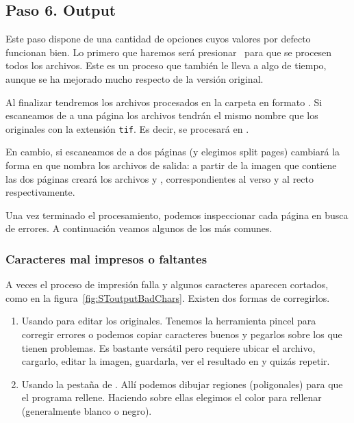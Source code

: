 \documentclass[%
	a5paper,
	10pt,
	twoside,
	openright,
	final,
]{memoir}
\begin{document}
{	\subsection{Paso 6. Output\label{sec:SToutput}} Este paso dispone de una cantidad de opciones cuyos valores por defecto funcionan bien. Lo primero que haremos será presionar \play\ para que se procesen todos los archivos. Este es un proceso que también le lleva a \scantailorAdvanced algo de tiempo, aunque se ha mejorado mucho respecto de la versión original.

	Al finalizar tendremos los archivos procesados en la carpeta  en formato \tiff. Si escaneamos de a una página los archivos tendrán el mismo nombre que los originales con la extensión \texttt{tif}. Es decir,  se procesará en .

	En cambio, si escaneamos de a dos páginas (y elegimos split pages) cambiará la forma en que \scantailor nombra los archivos de salida: a partir de la imagen  que contiene las dos páginas creará los archivos  y , correspondientes al verso y al recto respectivamente.

	Una vez terminado el procesamiento, podemos inspeccionar cada página en busca de errores. A continuación veamos algunos de los más comunes.

	\subsubsection{Caracteres mal impresos o faltantes} A veces el proceso de impresión falla y algunos caracteres aparecen cortados, como en la figura~\ref{fig:SToutputBadChars}. Existen dos formas de corregirlos.
	\begin{enumerate}
		\item Usando \gimp para editar los originales. Tenemos la herramienta pincel para corregir errores o podemos copiar caracteres buenos y pegarlos sobre los que tienen problemas. Es bastante versátil pero requiere ubicar el archivo, cargarlo, editar la imagen, guardarla, ver el resultado en \scantailor y quizás repetir. %
		\item Usando la pestaña  de \scantailor. Allí podemos dibujar regiones (poligonales) para que el programa rellene. Haciendo  sobre ellas elegimos el color para rellenar (generalmente blanco o negro).
	\end{enumerate}

}
\end{document}
